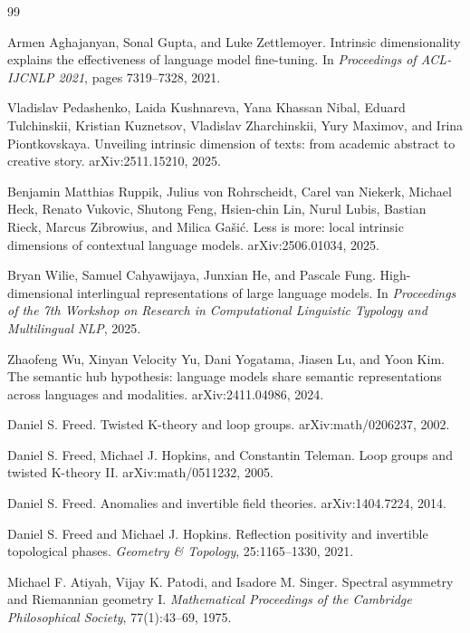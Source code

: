 \documentclass[11pt]{article}
\begin{document}
\begin{thebibliography}{99}

Armen Aghajanyan, Sonal Gupta, and Luke Zettlemoyer.
\newblock Intrinsic dimensionality explains the effectiveness of language model fine-tuning.
\newblock In \emph{Proceedings of ACL-IJCNLP 2021}, pages 7319--7328, 2021.

Vladislav Pedashenko, Laida Kushnareva, Yana Khassan Nibal, Eduard Tulchinskii, Kristian Kuznetsov, Vladislav Zharchinskii, Yury Maximov, and Irina Piontkovskaya.
\newblock Unveiling intrinsic dimension of texts: from academic abstract to creative story.
\newblock arXiv:2511.15210, 2025.

Benjamin Matthias Ruppik, Julius von Rohrscheidt, Carel van Niekerk, Michael Heck, Renato Vukovic, Shutong Feng, Hsien-chin Lin, Nurul Lubis, Bastian Rieck, Marcus Zibrowius, and Milica Ga\v{s}i\'{c}.
\newblock Less is more: local intrinsic dimensions of contextual language models.
\newblock arXiv:2506.01034, 2025.

Bryan Wilie, Samuel Cahyawijaya, Junxian He, and Pascale Fung.
\newblock High-dimensional interlingual representations of large language models.
\newblock In \emph{Proceedings of the 7th Workshop on Research in Computational Linguistic Typology and Multilingual NLP}, 2025.

Zhaofeng Wu, Xinyan Velocity Yu, Dani Yogatama, Jiasen Lu, and Yoon Kim.
\newblock The semantic hub hypothesis: language models share semantic representations across languages and modalities.
\newblock arXiv:2411.04986, 2024.

Daniel S. Freed.
\newblock Twisted K-theory and loop groups.
\newblock arXiv:math/0206237, 2002.

Daniel S. Freed, Michael J. Hopkins, and Constantin Teleman.
\newblock Loop groups and twisted K-theory II.
\newblock arXiv:math/0511232, 2005.

Daniel S. Freed.
\newblock Anomalies and invertible field theories.
\newblock arXiv:1404.7224, 2014.

Daniel S. Freed and Michael J. Hopkins.
\newblock Reflection positivity and invertible topological phases.
\newblock \emph{Geometry \& Topology}, 25:1165--1330, 2021.

Michael F. Atiyah, Vijay K. Patodi, and Isadore M. Singer.
\newblock Spectral asymmetry and Riemannian geometry I.
\newblock \emph{Mathematical Proceedings of the Cambridge Philosophical Society}, 77(1):43--69, 1975.


\end{thebibliography}
\end{document}
